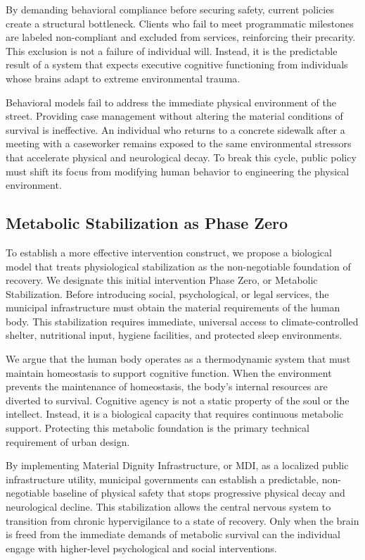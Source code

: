 \documentclass[12pt]{article}
\begin{document}
By demanding behavioral compliance before securing safety, current policies create a structural bottleneck. Clients who fail to meet programmatic milestones are labeled non-compliant and excluded from services, reinforcing their precarity. This exclusion is not a failure of individual will. Instead, it is the predictable result of a system that expects executive cognitive functioning from individuals whose brains adapt to extreme environmental trauma.

Behavioral models fail to address the immediate physical environment of the street. Providing case management without altering the material conditions of survival is ineffective. An individual who returns to a concrete sidewalk after a meeting with a caseworker remains exposed to the same environmental stressors that accelerate physical and neurological decay. To break this cycle, public policy must shift its focus from modifying human behavior to engineering the physical environment.

\subsection{Metabolic Stabilization as Phase Zero}
To establish a more effective intervention construct, we propose a biological model that treats physiological stabilization as the non-negotiable foundation of recovery. We designate this initial intervention Phase Zero, or Metabolic Stabilization. Before introducing social, psychological, or legal services, the municipal infrastructure must obtain the material requirements of the human body. This stabilization requires immediate, universal access to climate-controlled shelter, nutritional input, hygiene facilities, and protected sleep environments.

We argue that the human body operates as a thermodynamic system that must maintain homeostasis to support cognitive function. When the environment prevents the maintenance of homeostasis, the body's internal resources are diverted to survival. Cognitive agency is not a static property of the soul or the intellect. Instead, it is a biological capacity that requires continuous metabolic support. Protecting this metabolic foundation is the primary technical requirement of urban design.

By implementing Material Dignity Infrastructure, or MDI, as a localized public infrastructure utility, municipal governments can establish a predictable, non-negotiable baseline of physical safety that stops progressive physical decay and neurological decline. This stabilization allows the central nervous system to transition from chronic hypervigilance to a state of recovery. Only when the brain is freed from the immediate demands of metabolic survival can the individual engage with higher-level psychological and social interventions.
\end{document}
